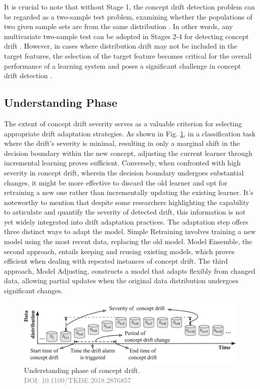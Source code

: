 It is crucial to note that without Stage 1, the concept drift detection problem can be regarded as a two-sample test problem, examining whether the populations of two given sample sets are from the same distribution \cite{dries2009adaptive}. In other words, any multivariate two-sample test can be adopted in Stages 2-4 for detecting concept drift \cite{dries2009adaptive}. However, in cases where distribution drift may not be included in the target features, the selection of the target feature becomes critical for the overall performance of a learning system and poses a significant challenge in concept drift detection \cite{yamada2013change}.

\subsection{Understanding Phase}
The extent of concept drift severity serves as a valuable criterion for selecting appropriate drift adaptation strategies. As shown in Fig. \ref{fig:concept-drift-understanding}, in a classification task where the drift's severity is minimal, resulting in only a marginal shift in the decision boundary within the new concept, adjusting the current learner through incremental learning proves sufficient. Conversely, when confronted with high severity in concept drift, wherein the decision boundary undergoes substantial changes, it might be more effective to discard the old learner and opt for retraining a new one rather than incrementally updating the existing learner. It's noteworthy to mention that despite some researchers highlighting the capability to articulate and quantify the severity of detected drift, this information is not yet widely integrated into drift adaptation practices.
The adaptation step offers three distinct ways to adapt the model. Simple Retraining involves training a new model using the most recent data, replacing the old model. Model Ensemble, the second approach, entails keeping and reusing existing models, which proves efficient when dealing with repeated instances of concept drift. The third approach, Model Adjusting, constructs a model that adapts flexibly from changed data, allowing partial updates when the original data distribution undergoes significant changes.

\begin{figure}[!ht]
    \centering
    \includegraphics[width=.9\textwidth]{2_Background/figures/concept_drift_understanding.png}
    \caption{Understanding phase of concept drift. \\ \textcolor{gray}{\fontsize{10}{0}\selectfont DOI: 10.1109/TKDE.2018.2876857}}
    \label{fig:concept-drift-understanding}
\end{figure}

